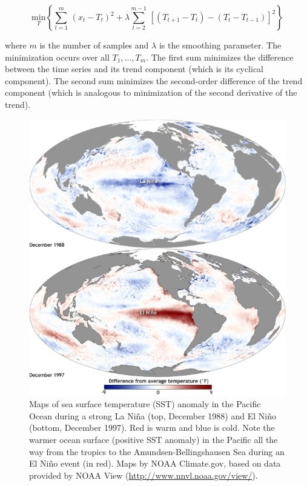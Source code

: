 \begin{equation}
  \underset{T}{\text{min}} \left\{
    \sum_{t=1}^m \, (x_t - T_t)^2 +
    \lambda \sum_{t=2}^{m-1} \, [(T_{t+1} - T_t) - (T_t - T_{t-1})]^2
  \right\}
  \label{hp-filter}
\end{equation}

\noindent
where $m$ is the number of samples and $\lambda$ is the smoothing parameter. The minimization occurs over all $T_1, ..., T_m$. The first sum minimizes the difference between the time series and its trend component (which is its cyclical component). The second sum minimizes the second-order difference of the trend component (which is analogous to minimization of the second derivative of the trend).\\[.5cm]


\begin{figure}[!ht]
  \centering
  \includegraphics[width=.76\textwidth]{img/enso.jpg}
  \caption[Maps of sea surface temperature (SST) anomaly]{
  \ssp \footnotesize
Maps of sea surface temperature (SST) anomaly in the Pacific Ocean during a strong La Ni\~na (top, December 1988) and El Ni\~no (bottom, December 1997). Red is warm and blue is cold. Note the warmer ocean surface (positive SST anomaly) in the Pacific all the way from the tropics to the Amundsen-Bellingshausen Sea during an El Ni\~no event (in red). Maps by NOAA Climate.gov, based on data provided by NOAA View (\url{http://www.nnvl.noaa.gov/view/}).
  }
  \label{fig:map-enso}
\end{figure}


